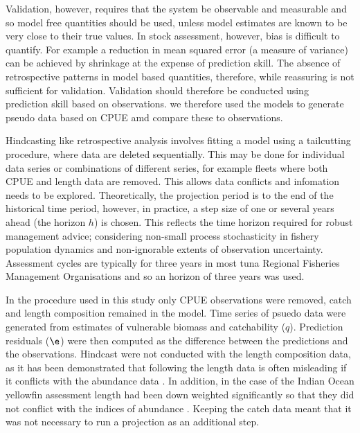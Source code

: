 \documentclass[12pt,halfline,a4paper,nonumbib]{ouparticle}
\begin{document}
Validation, however, requires that the system be observable and measurable and so model free quantities should be used, unless model estimates are known to be very close to their true values. In stock assessment, however, bias is difficult to quantify. For example a reduction in mean squared error (a measure of variance) can be achieved by shrinkage at the expense of prediction skill. The absence of retrospective patterns in model based quantities, therefore, while reassuring is not sufficient for validation. Validation should therefore be conducted using prediction skill based on observations. we therefore used the models to generate pseudo data based on CPUE amd compare these to observations. 

Hindcasting like retrospective analysis involves fitting a model using a tailcutting procedure, where data are deleted sequentially. This may be done for individual data series or combinations of different series, for example fleets where both CPUE and length data are removed. This allows data conflicts and infomation needs to be explored. Theoretically, the projection period is to the end of the historical time period, however, in practice, a step size of one or several years ahead (the horizon $h$) is chosen. This reflects the time horizon required for robust management advice; considering non-small process stochasticity in fishery population dynamics and non-ignorable extents of observation uncertainty. 
Assessment cycles are typically for three years in most tuna Regional Fisheries Management Organisations and so an horizon of three years was used.

In the procedure used in this study only CPUE observations were removed, catch and length composition remained in the model. Time series of psuedo data were generated from estimates of vulnerable biomass and catchability ($q$). Prediction residuals ($\e$) were then computed as the difference between the predictions and the observations. Hindcast were not conducted with the length composition data, as it has been demonstrated that following the length data is often misleading if it conflicts with the abundance data \parencite{francis2011data}. In addition, in the case of the Indian Ocean yellowfin assessment length had been down weighted significantly so that they did not conflict with the indices of abundance \parencite{fu2018yft}. Keeping the catch data meant that it was not necessary to run a projection as an additional step.
\end{document}
